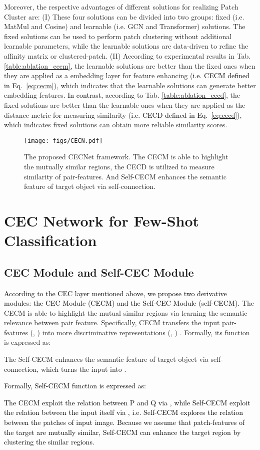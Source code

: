 \documentclass{article}
\newcommand{\ljx}[1]{\textcolor{black}{#1}}
\newcommand{\seasons}[1]{\textcolor{black}{#1}}
\begin{document}
Moreover, the respective advantages of different solutions for realizing Patch Cluster are: (I) These four solutions can be divided into two groups: fixed (i.e. MatMul and Cosine) and learnable (i.e. GCN and Transformer) solutions. The fixed solutions can be used to perform patch clustering without additional learnable parameters, while the learnable solutions are data-driven to refine the affinity matrix or clustered-patch.
(II) According to experimental results in Tab. \ref{table:ablation_cecm}, the learnable solutions are better than the fixed ones when they are applied as a embedding layer for feature enhancing (\ljx{i.e. CECM defined in Eq.~\ref{eq:cecm}}), which indicates that the learnable solutions can generate better embedding features.
\seasons{In contrast,} according to Tab. \ref{table:ablation_cecd}, the fixed solutions are better than the learnable ones when they are applied as the distance metric for measuring similarity (\ljx{i.e. CECD defined in Eq.~\ref{eq:cecd}}), which indicates fixed solutions can obtain more reliable similarity scores.


\begin{figure*}[!t]
\centering
\texttt{[image: figs/CECN.pdf]}
\caption{The proposed CECNet framework. The CECM is able to highlight the mutually similar regions, the CECD is utilized to measure similarity of pair-features. And Self-CECM enhances the semantic feature of target object via self-connection.}
\label{fig:CECN}
\end{figure*}


\section{CEC Network for Few-Shot Classification}
\subsection{CEC Module and Self-CEC Module}
\label{subsec:cecm}
\seasons{According to the CEC layer mentioned above, we propose two derivative modules: the CEC Module (CECM) and the Self-CEC Module (self-CECM).}
The CECM is able to highlight the mutual similar regions via learning the semantic relevance between pair feature.
Specifically, CECM transfers the input pair-features (, )  into more discriminative representations (, ) .
Formally, its function  is expressed as:


The Self-CECM enhances the semantic feature of target object via self-connection, which turns the input  into .
\ljx{
Formally, Self-CECM function  is expressed as:

}\ljx{The CECM exploit the relation between P and Q via , while Self-CECM exploit the relation between the input itself via , i.e. Self-CECM explores the relation between the patches of input image. Because we assume that patch-features of the target are mutually similar, Self-CECM can enhance the target region by clustering the similar regions.}
\end{document}
